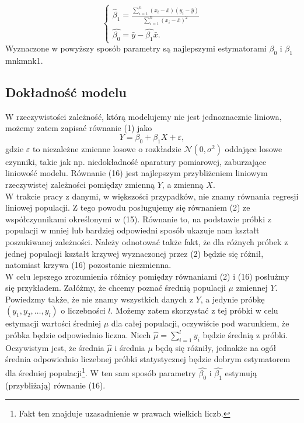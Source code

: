 \documentclass[a4paper]{article}
\begin{document}
\begin{equation}\label{(3.14)}
\left\{ \begin{array}{ll}
    \hat{\beta}_1 = \frac{\sum\limits_{i=1}^n{(x_i - \bar{x})(y_i - \bar{y})}}{\sum\limits_{i=1}^n{(x_i - \bar{x})^2}} \\
    \hat{\beta_0} = \bar{y} - \hat{\beta_1}\bar{x}.
\end{array} \right.
\end{equation}
Wyznaczone w powyższy sposób parametry są najlepszymi estymatorami $\beta_0$ i  $\beta_1$ {mnk}{mnk1}. 


\subsection{Dokładność modelu}
W rzeczywistości zależność, którą modelujemy nie jest jednoznacznie liniowa, możemy zatem zapisać równanie {(1)} jako
\begin{equation}\label{(3.15)}
    Y = \beta_0 + \beta_1 X + \varepsilon,
\end{equation}
gdzie $\varepsilon$ to niezależne zmienne losowe o rozkładzie $\mathcal{N}(0,\sigma^2)$ oddające losowe czynniki, takie jak np. niedokładność aparatury pomiarowej, zaburzające liniowość modelu. Równanie {(16)} jest najlepszym przybliżeniem liniowym rzeczywistej zależności pomiędzy zmienną $Y$, a zmienną $X$.
\\\indent W trakcie pracy z danymi, w większości przypadków, nie znamy równania regresji liniowej populacji. Z tego powodu posługujemy się równaniem {(2)} ze współczynnikami określonymi w {(15)}. Równanie to, na podstawie próbki z populacji w mniej lub bardziej odpowiedni sposób ukazuje nam kształt poszukiwanej zależności. Należy odnotować także fakt, że dla różnych próbek z jednej populacji kształt krzywej wyznaczonej przez {(2)} będzie się różnił, natomiast krzywa {(16)} pozostanie niezmienna. 
\\\indent W celu lepszego zrozumienia różnicy pomiędzy równaniami {(2)} i  {(16)} posłużmy się przykładem. Załóżmy, że chcemy poznać średnią populacji $\mu$ zmiennej $Y$. Powiedzmy także, że nie znamy wszystkich danych z $Y$, a jedynie próbkę $(y_1, y_2, \dots, y_l)$ o liczebności $l$. Możemy zatem skorzystać z tej próbki w celu estymacji wartości średniej $\mu$ dla całej populacji, oczywiście pod warunkiem, że próbka będzie odpowiednio liczna. Niech $\hat{\mu} = \sum_{i=1}^l{y_i}$ będzie średnią z próbki. Oczywistym jest, że średnia $\hat{\mu}$ i średnia ${\mu}$ będą się różniły, jednakże na ogół średnia odpowiednio liczebnej próbki statystycznej będzie dobrym estymatorem dla średniej populacji\footnote{Fakt ten znajduje uzasadnienie w prawach wielkich liczb.}. W ten sam sposób parametry $\hat{\beta_0}$ i $\hat{\beta_1}$ estymują (przybliżają) równanie {(16)}.
\end{document}
